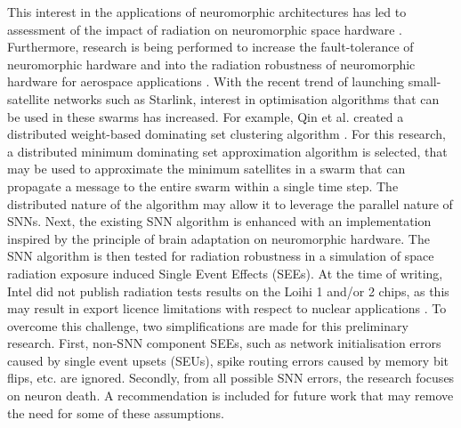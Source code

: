 This interest in the applications of neuromorphic architectures has led to assessment of the impact of radiation on neuromorphic space hardware \cite{cantley_impact_2021,roffe_neutron-induced_2021}. Furthermore, research is being performed to increase the fault-tolerance of neuromorphic hardware \cite{tran_design_2011} and into the radiation robustness of neuromorphic hardware for aerospace applications \cite{vaz_cmos_2020}. %
With the recent trend of launching small-satellite networks such as Starlink, interest in optimisation algorithms that can be used in these swarms has increased.
For example, Qin et al. created a distributed weight-based dominating set clustering algorithm \cite{qin2012weight}.
For this research, a distributed minimum dominating set approximation algorithm is selected, that may be used to approximate the minimum satellites in a swarm that can propagate a message to the entire swarm within a single time step. The distributed nature of the algorithm may allow it to leverage the parallel nature of SNNs.
Next, the existing SNN algorithm is enhanced with an implementation inspired by the principle of brain adaptation on neuromorphic hardware. The SNN algorithm is then tested for radiation robustness in a simulation of space radiation exposure induced Single Event Effects (SEEs). At the time of writing, Intel did not publish radiation tests results on the Loihi 1 and/or 2 chips, as this may result in export licence limitations with respect to nuclear applications \cite{inrc_meeting}. To overcome this challenge, two simplifications are made for this preliminary research. First, non-SNN component SEEs, such as network initialisation errors caused by single event upsets (SEUs), spike routing errors caused by memory bit flips, etc. are ignored. Secondly, from all possible SNN errors, the research focuses on neuron death. A recommendation is included for future work that may remove the need for some of these assumptions. %

